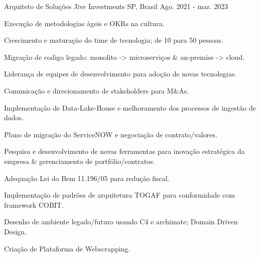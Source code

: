 

\begin{cventries}


   	\cventry
	{Arquiteto de Soluções} %
	{Jive Investments} %
	{SP, Brasil} %
	{Ago. 2021 - mar. 2023} %
	{
		\begin{cvitems} %
			\item {Execução de metodologias ágeis e OKRs na cultura.}
			\item {Crescimento e maturação do time de tecnologia; de 10 para 50 pessoas.}
			\item {Migração de codigo legado: monolito -> microserviços \& on-premise -> cloud.}
			\item {Liderança de equipes de desenvolvimento para adoção de novas tecnologias.}			
			\item {Comunicação e direcionamento de stakeholders para M\&As.}			
			\item {Implementação de Data-Lake-House e melhoramento dos processos de ingestão de dados.}
			\item {Plano de migração do ServiceNOW e negociação de contrato/valores.}
			\item {Pesquisa e desenvolvimento de novas ferramentas para inovação estratégica da empresa \& gerenciamento de portfólio/contratos. }
			\item {Adequação Lei do Bem 11.196/05 para redução fiscal.}			
			\item {Implementação de padrões de arquitetura TOGAF para conformidade com framework COBIT.}
			\item {Desenho de ambiente legado/futuro  usando C4 e archimate; Domain Driven Design.}
			\item {Criação de Plataforma de Webscrapping.}					
		\end{cvitems}
	}
 

\end{cventries}
